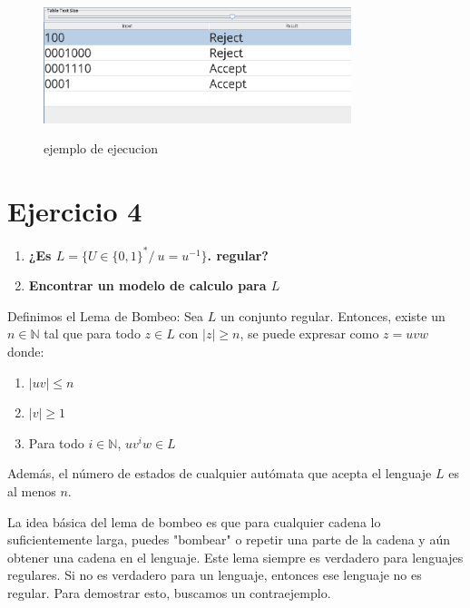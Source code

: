\documentclass{article}
\begin{document}
        \newpage
        \begin{figure}[!h]
            \centering
            \includegraphics[width=0.8\textwidth]{./Imagenes/image24.png}
            \label{fig:label4}
            \caption{ejemplo de ejecucion}
        \end{figure}

        


        \newpage


        \section*{Ejercicio 4}
        \begin{enumerate}
            \item \textbf{¿Es $L = \{ U \in \{0, 1\}^* /\  u=u^{-1} \}$. regular? }
            \item \textbf{Encontrar un modelo de calculo para $L$ }
        \end{enumerate}

        Definimos el Lema de Bombeo: Sea \( L \) un conjunto regular. Entonces, existe un \( n \in \mathbb{N} \) tal que para todo \( z \in L \) con \( |z| \geq n \), se puede expresar como \( z = u v w \) donde:
        \begin{enumerate}
          \item \( |uv| \leq n \)
          \item \( |v| \geq 1 \)
          \item Para todo \( i \in \mathbb{N} \), \( uv^iw \in L \)
        \end{enumerate}
        Además, el número de estados de cualquier autómata que acepta el lenguaje \( L \) es al menos \( n \).
        \vspace{\baselineskip} %

        La idea básica del lema de bombeo es que para cualquier cadena lo suficientemente larga, 
        puedes "bombear" o repetir una parte de la cadena y 
        aún obtener una cadena en el lenguaje. 
        Este lema siempre es verdadero para lenguajes regulares. 
        Si no es verdadero para un lenguaje, entonces ese lenguaje 
        no es regular. Para demostrar esto, buscamos un contraejemplo.
        
\end{document}
